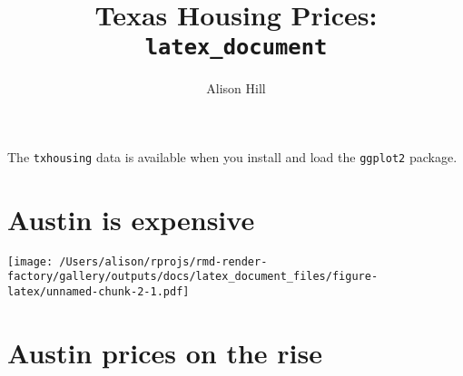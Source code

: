 \documentclass[]{article}
\title{Texas Housing Prices: \texttt{latex\_document}}
\author{Alison Hill}
\date{}
\newenvironment{Shaded}{\begin{snugshade}}{\end{snugshade}}
\newcommand{\CharTok}[1]{\textcolor[rgb]{0.31,0.60,0.02}{#1}}
\newcommand{\DataTypeTok}[1]{\textcolor[rgb]{0.13,0.29,0.53}{#1}}
\newcommand{\KeywordTok}[1]{\textcolor[rgb]{0.13,0.29,0.53}{\textbf{#1}}}
\newcommand{\NormalTok}[1]{#1}
\newcommand{\OperatorTok}[1]{\textcolor[rgb]{0.81,0.36,0.00}{\textbf{#1}}}
\newcommand{\StringTok}[1]{\textcolor[rgb]{0.31,0.60,0.02}{#1}}
\begin{document}
\maketitle

The \texttt{txhousing} data is available when you install and load the
\texttt{ggplot2} package.

\begin{Shaded}
\end{Shaded}

\hypertarget{austin-is-expensive}{%
\section{Austin is expensive}\label{austin-is-expensive}}

\begin{Shaded}
\end{Shaded}

\texttt{[image: /Users/alison/rprojs/rmd-render-factory/gallery/outputs/docs/latex\_document\_files/figure-latex/unnamed-chunk-2-1.pdf]}

\hypertarget{austin-prices-on-the-rise}{%
\section{Austin prices on the rise}\label{austin-prices-on-the-rise}}
\end{document}
